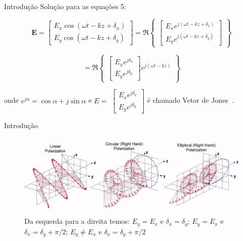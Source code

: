 \documentclass{beamer} %
\begin{document}
\begin{frame}{Introdução}
    Solução para as equações 5:
    
    \begin{displaymath}
       \mathbf{E} =
        \begin{bmatrix}
             E_x \cos(\omega t - kz + \delta_x)\\
             E_y \cos(\omega t - kz + \delta_y)
        \end{bmatrix}
        = \Re
        \begin{Bmatrix}
            \begin{bmatrix}
                 E_x e^{j(\omega t - kz + \delta_x)}\\
                 E_y e^{j(\omega t - kz + \delta_y)}
            \end{bmatrix}
        \end{Bmatrix}
    \end{displaymath}
    
    \begin{displaymath}
        = \Re
            \begin{Bmatrix}
                \begin{bmatrix}
                     E_x e^{j\delta_x}\\
                     E_y e^{j\delta_y}
                \end{bmatrix}
                e^{j(\omega t - kz)}
            \end{Bmatrix}
    \end{displaymath}
    
    \vspace{0.05\linewidth}
    
    onde $e^{j\alpha} = \cos \alpha + j\sin \alpha$ e $E =$ 
    $
    \begin{bmatrix}
         E_x e^{j\delta_x}\\
         E_y e^{j\delta_y}
    \end{bmatrix}
    $
    é chamado Vetor de Jones~\cite{Pottier09}.

\end{frame}

\begin{frame}{Introdução}
   
   \begin{figure}
           \centering
           \includegraphics[width = .9\linewidth]{eletro_wave.jpg}
           \caption{Da esquerda para a direita temos: $E_y = E_x$ e $\delta_x = \delta_y$; $E_y = E_x$ e $\delta_x = \delta_y + \pi/2$; $E_y \neq E_x$ e $\delta_x = \delta_y + \pi/2$ }
           \label{fig:eletro_wave}
    \end{figure}
    
\end{frame}
\end{document}
